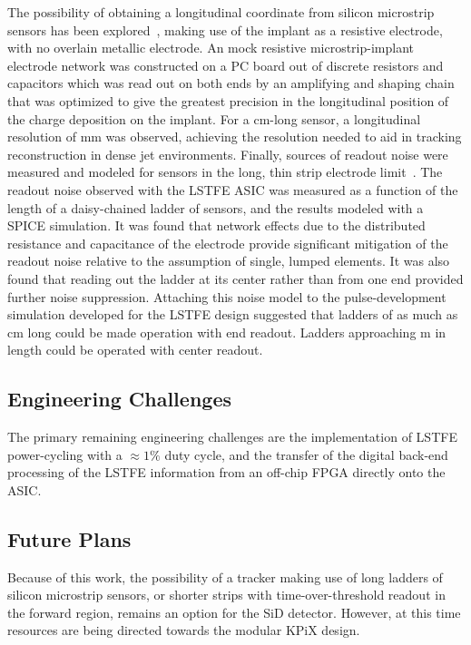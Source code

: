 The possibility of obtaining a longitudinal coordinate from silicon
microstrip sensors has been explored~\cite{Carman2011118}, making use of the
implant as a resistive electrode, with no overlain metallic electrode. An mock resistive
microstrip-implant electrode network was constructed on a PC board out of discrete resistors and capacitors
which was read out on both ends by an amplifying and shaping chain that was optimized to give the greatest
precision in the longitudinal position of the charge deposition on the implant. For a \unit[10]{cm}-long sensor,
a longitudinal resolution of \unit[6]{mm} was observed, achieving the resolution needed to aid in tracking
reconstruction in dense jet environments. Finally, sources of readout noise were measured and modeled
for sensors in the long, thin strip electrode limit~\cite{Collier2013127}. The readout noise observed
with the LSTFE ASIC was measured as a function of the length of a daisy-chained ladder of sensors,
and the results modeled with a SPICE simulation. It was found that network effects due to the
distributed resistance and capacitance of the electrode provide significant
mitigation of the readout noise relative to the assumption of single, lumped elements. It
was also found that reading out the ladder at its center rather than from one end provided
further noise suppression. Attaching this noise model to the pulse-development simulation
developed for the LSTFE design suggested that ladders of as much as \unit[75]{cm} long could be
made operation with end readout. Ladders approaching \unit[1]{m} in length could be operated with center readout.

\subsection{Engineering Challenges}

The primary remaining engineering challenges are the implementation of LSTFE power-cycling with a $\approx 1\%$
duty cycle, and the transfer of the digital back-end processing of the LSTFE information from
an off-chip FPGA directly onto the ASIC.

\subsection{Future Plans}

Because of this work, the possibility of a tracker making use of long ladders of silicon
microstrip sensors, or shorter strips with time-over-threshold readout in the forward
region, remains an option for the SiD detector. However, at this time resources are
being directed towards the modular KPiX design.

